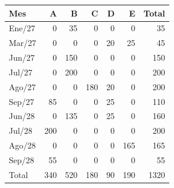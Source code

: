 \begin{tabular}{lr r r r r r}
\toprule
Mes & A & B & C & D & E & Total \\
\midrule
Ene/27 & 0 & 35 & 0 & 0 & 0 & 35 \\
Mar/27 & 0 & 0 & 0 & 20 & 25 & 45 \\
Jun/27 & 0 & 150 & 0 & 0 & 0 & 150 \\
Jul/27 & 0 & 200 & 0 & 0 & 0 & 200 \\
Ago/27 & 0 & 0 & 180 & 20 & 0 & 200 \\
Sep/27 & 85 & 0 & 0 & 25 & 0 & 110 \\
Jun/28 & 0 & 135 & 0 & 25 & 0 & 160 \\
Jul/28 & 200 & 0 & 0 & 0 & 0 & 200 \\
Ago/28 & 0 & 0 & 0 & 0 & 165 & 165 \\
Sep/28 & 55 & 0 & 0 & 0 & 0 & 55 \\
\midrule
Total & 340 & 520 & 180 & 90 & 190 & 1320 \\
\bottomrule
\end{tabular}
